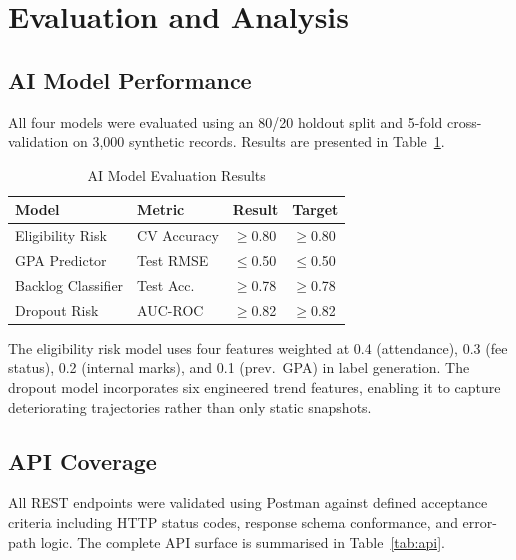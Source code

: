 \documentclass[conference]{IEEEtran}
\begin{document}
\section{Evaluation and Analysis}

\subsection{AI Model Performance}

All four models were evaluated using an 80/20 holdout split and 5-fold
cross-validation on 3,000 synthetic records. Results are presented in
Table~\ref{tab:results}.

\begin{table}[htbp]
\caption{AI Model Evaluation Results}
\label{tab:results}
\centering
\begin{tabular}{llll}
\toprule
\textbf{Model} & \textbf{Metric} & \textbf{Result} & \textbf{Target} \\
\midrule
Eligibility Risk  & CV Accuracy & $\geq$0.80 & $\geq$0.80 \\
GPA Predictor     & Test RMSE   & $\leq$0.50 & $\leq$0.50 \\
Backlog Classifier& Test Acc.   & $\geq$0.78 & $\geq$0.78 \\
Dropout Risk      & AUC-ROC     & $\geq$0.82 & $\geq$0.82 \\
\bottomrule
\end{tabular}
\end{table}

The eligibility risk model uses four features weighted at 0.4
(attendance), 0.3 (fee status), 0.2 (internal marks), and 0.1 (prev.\ GPA)
in label generation. The dropout model incorporates six engineered trend
features, enabling it to capture deteriorating trajectories rather than only
static snapshots.

\subsection{API Coverage}

All REST endpoints were validated using Postman against defined acceptance
criteria including HTTP status codes, response schema conformance, and
error-path logic. The complete API surface is summarised in
Table~\ref{tab:api}.
\end{document}
